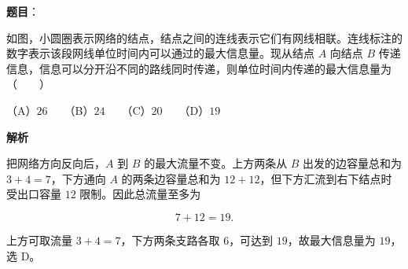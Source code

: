 \begin{answer}

\textbf{题目}：

如图，小圆圈表示网络的结点，结点之间的连线表示它们有网线相联。连线标注的数字表示该段网线单位时间内可以通过的最大信息量。现从结点 $A$ 向结点 $B$ 传递信息，信息可以分开沿不同的路线同时传递，则单位时间内传递的最大信息量为\mbox{（　　）}
\nopagebreak[4]
\begin{center}\end{center}
\nopagebreak[4]
（A）$26$　　（B）$24$　　（C）$20$　　（D）$19$

\textbf{解析}

把网络方向反向后，$A$ 到 $B$ 的最大流量不变。上方两条从 $B$ 出发的边容量总和为 $3+4=7$，下方通向 $A$ 的两条边容量总和为 $12+12$，但下方汇流到右下结点时受出口容量 $12$ 限制。因此总流量至多为

\nopagebreak[4]
\[
7+12=19.
\]

上方可取流量 $3+4=7$，下方两条支路各取 $6$，可达到 $19$，故最大信息量为 $19$，选 D。


\end{answer}


